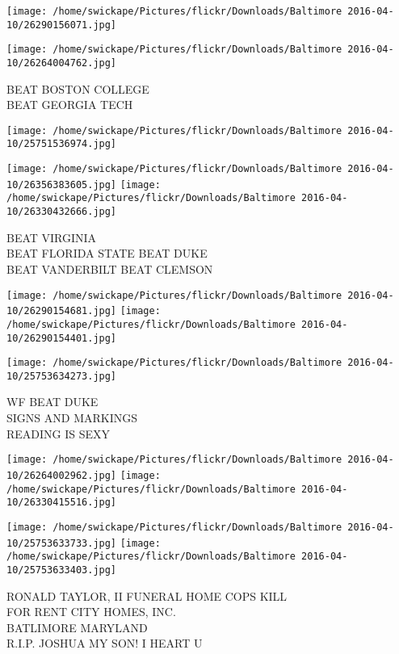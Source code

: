 \documentclass[10pt,letterpaper]{article}
\begin{document}
\texttt{[image: /home/swickape/Pictures/flickr/Downloads/Baltimore 2016-04-10/26290156071.jpg]}

\vspace{0.25in}
\texttt{[image: /home/swickape/Pictures/flickr/Downloads/Baltimore 2016-04-10/26264004762.jpg]}

BEAT BOSTON COLLEGE\\
BEAT GEORGIA TECH\\
\pagebreak

\texttt{[image: /home/swickape/Pictures/flickr/Downloads/Baltimore 2016-04-10/25751536974.jpg]}

\vspace{0.25in}
\texttt{[image: /home/swickape/Pictures/flickr/Downloads/Baltimore 2016-04-10/26356383605.jpg]}
\texttt{[image: /home/swickape/Pictures/flickr/Downloads/Baltimore 2016-04-10/26330432666.jpg]}

BEAT VIRGINIA\\
BEAT FLORIDA STATE BEAT DUKE\\
BEAT VANDERBILT BEAT CLEMSON\\
\pagebreak

\texttt{[image: /home/swickape/Pictures/flickr/Downloads/Baltimore 2016-04-10/26290154681.jpg]}
\texttt{[image: /home/swickape/Pictures/flickr/Downloads/Baltimore 2016-04-10/26290154401.jpg]}

\vspace{0.25in}
\texttt{[image: /home/swickape/Pictures/flickr/Downloads/Baltimore 2016-04-10/25753634273.jpg]}

WF BEAT DUKE\\
SIGNS AND MARKINGS\\
READING IS SEXY\\
\pagebreak

\texttt{[image: /home/swickape/Pictures/flickr/Downloads/Baltimore 2016-04-10/26264002962.jpg]}
\texttt{[image: /home/swickape/Pictures/flickr/Downloads/Baltimore 2016-04-10/26330415516.jpg]}

\texttt{[image: /home/swickape/Pictures/flickr/Downloads/Baltimore 2016-04-10/25753633733.jpg]}
\texttt{[image: /home/swickape/Pictures/flickr/Downloads/Baltimore 2016-04-10/25753633403.jpg]}

RONALD TAYLOR, II FUNERAL HOME COPS KILL\\
FOR RENT CITY HOMES, INC.\\
BATLIMORE MARYLAND\\
R.I.P. JOSHUA MY SON! I HEART U\\
\pagebreak
\end{document}
